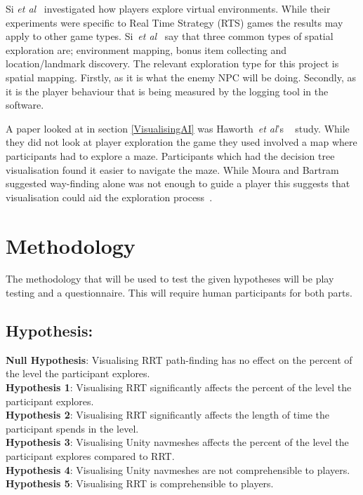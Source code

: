 \documentclass[journal]{IEEEtran}
\begin{document}
Si \textit{et al}~\cite{si2017} investigated how players explore virtual environments. While their experiments were specific to Real Time Strategy (RTS) games the results may apply to other game types. Si~\textit{et al}~\cite{si2017} say that three common types of spatial exploration are; environment mapping, bonus item collecting and location/landmark discovery. The relevant exploration type for this project is spatial mapping. Firstly, as it is what the enemy NPC will be doing.  Secondly, as it is the player behaviour that is being measured by the logging tool in the software.

A paper looked at in section \ref{VisualisingAI} was Haworth~\textit{et al}'s ~\cite{Haworth2010} study. While they did not look at player exploration the game they used involved a map where participants had to explore a maze. Participants which had the decision tree visualisation found it easier to navigate the maze. While Moura and Bartram~\cite{moura2014} suggested way-finding alone was not enough to guide a player this suggests that visualisation could aid the exploration process~\cite{Haworth2010}.

\section{Methodology} \label{methodology}
The methodology that will be used to test the given hypotheses will be play testing and a questionnaire. This will require human participants for both parts.

\subsection{Hypothesis:}
\textbf{Null Hypothesis}: Visualising RRT path-finding has no effect on the percent of the level the participant explores. \\
\textbf{Hypothesis 1}: Visualising RRT significantly affects the percent of the level the participant explores. \\
\textbf{Hypothesis 2}: Visualising RRT significantly affects the length of time the participant spends in the level. \\
\textbf{Hypothesis 3}: Visualising Unity navmeshes affects the percent of the level the participant explores compared to RRT. \\
\textbf{Hypothesis 4}: Visualising Unity navmeshes are not comprehensible to players. \\
\textbf{Hypothesis 5}: Visualising RRT is comprehensible to players. \\
\end{document}
